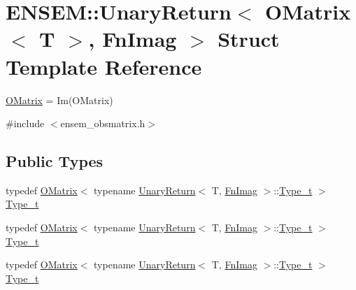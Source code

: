 \hypertarget{structENSEM_1_1UnaryReturn_3_01OMatrix_3_01T_01_4_00_01FnImag_01_4}{}\section{E\+N\+S\+EM\+:\+:Unary\+Return$<$ O\+Matrix$<$ T $>$, Fn\+Imag $>$ Struct Template Reference}
\label{structENSEM_1_1UnaryReturn_3_01OMatrix_3_01T_01_4_00_01FnImag_01_4}


\mbox{\hyperlink{classENSEM_1_1OMatrix}{O\+Matrix}} = Im(\+O\+Matrix)  




{\ttfamily \#include $<$ensem\+\_\+obsmatrix.\+h$>$}

\subsection*{Public Types}
\begin{DoxyCompactItemize}
\item 
typedef \mbox{\hyperlink{classENSEM_1_1OMatrix}{O\+Matrix}}$<$ typename \mbox{\hyperlink{structENSEM_1_1UnaryReturn}{Unary\+Return}}$<$ T, \mbox{\hyperlink{structENSEM_1_1FnImag}{Fn\+Imag}} $>$\+::\mbox{\hyperlink{structENSEM_1_1UnaryReturn_3_01OMatrix_3_01T_01_4_00_01FnImag_01_4_a0841f7311ee5495c55d754fd855f045c}{Type\+\_\+t}} $>$ \mbox{\hyperlink{structENSEM_1_1UnaryReturn_3_01OMatrix_3_01T_01_4_00_01FnImag_01_4_a0841f7311ee5495c55d754fd855f045c}{Type\+\_\+t}}
\item 
typedef \mbox{\hyperlink{classENSEM_1_1OMatrix}{O\+Matrix}}$<$ typename \mbox{\hyperlink{structENSEM_1_1UnaryReturn}{Unary\+Return}}$<$ T, \mbox{\hyperlink{structENSEM_1_1FnImag}{Fn\+Imag}} $>$\+::\mbox{\hyperlink{structENSEM_1_1UnaryReturn_3_01OMatrix_3_01T_01_4_00_01FnImag_01_4_a0841f7311ee5495c55d754fd855f045c}{Type\+\_\+t}} $>$ \mbox{\hyperlink{structENSEM_1_1UnaryReturn_3_01OMatrix_3_01T_01_4_00_01FnImag_01_4_a0841f7311ee5495c55d754fd855f045c}{Type\+\_\+t}}
\item 
typedef \mbox{\hyperlink{classENSEM_1_1OMatrix}{O\+Matrix}}$<$ typename \mbox{\hyperlink{structENSEM_1_1UnaryReturn}{Unary\+Return}}$<$ T, \mbox{\hyperlink{structENSEM_1_1FnImag}{Fn\+Imag}} $>$\+::\mbox{\hyperlink{structENSEM_1_1UnaryReturn_3_01OMatrix_3_01T_01_4_00_01FnImag_01_4_a0841f7311ee5495c55d754fd855f045c}{Type\+\_\+t}} $>$ \mbox{\hyperlink{structENSEM_1_1UnaryReturn_3_01OMatrix_3_01T_01_4_00_01FnImag_01_4_a0841f7311ee5495c55d754fd855f045c}{Type\+\_\+t}}
\end{DoxyCompactItemize}


